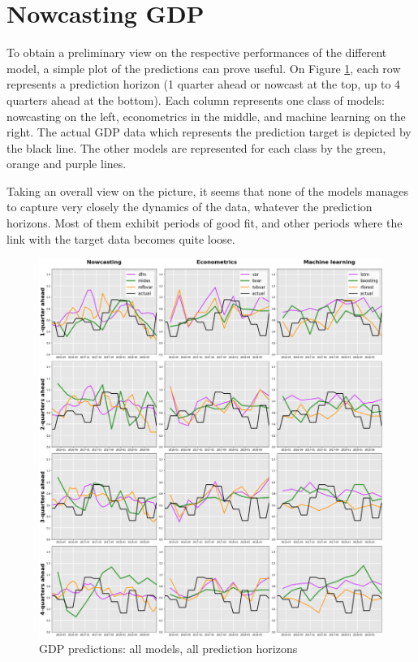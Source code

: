 \section{Nowcasting GDP}
\label{chapter4_section3}



To obtain a preliminary view on the respective performances of the different model, a simple plot of the predictions can prove useful. On Figure \ref{fig_c4_s3_1}, each row represents a prediction horizon (1 quarter ahead or nowcast at the top, up to 4 quarters ahead at the bottom). Each column represents one class of models: nowcasting on the left, econometrics in the middle, and machine learning on the right. The actual GDP data which represents the prediction target is depicted by the black line. The other models are represented for each class by the green, orange and purple lines.

Taking an overall view on the picture, it seems that none of the models manages to capture very closely the dynamics of the data, whatever the prediction horizons. Most of them exhibit periods of good fit, and other periods where the link with the target data becomes quite loose.

\newpage

\begin{figure}[H]
\centering
\includegraphics[scale=0.32]{images/predictions.png}
\caption{GDP predictions: all models, all prediction horizons}
\label{fig_c4_s3_1} \vspace{-6mm}
\end{figure}

